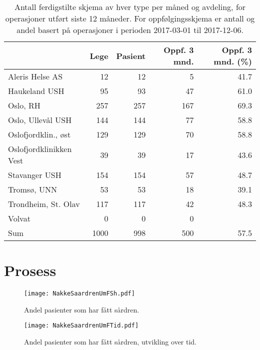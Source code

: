 \documentclass[presentation,xcolor=pdftex,dvipsnames,table]{beamer}\usepackage[]{graphicx}\usepackage[]{color}
\begin{document}
\begin{tiny}
\begin{frame}[fragile]
\begin{table}[ht]
\centering
\begin{tabular}{lrrrr}
  \hline
 & Lege & Pasient & Oppf. 3 mnd. & Oppf. 3 mnd. (\%) \\ 
  \hline
Aleris Helse AS & 12 & 12 & 5 & 41.7 \\ 
  Haukeland USH & 95 & 93 & 47 & 61.0 \\ 
  Oslo, RH & 257 & 257 & 167 & 69.3 \\ 
  Oslo, Ullevål USH & 144 & 144 & 77 & 58.8 \\ 
  Oslofjordklin., øst & 129 & 129 & 70 & 58.8 \\ 
  Oslofjordklinikken Vest & 39 & 39 & 17 & 43.6 \\ 
  Stavanger USH & 154 & 154 & 57 & 48.7 \\ 
  Tromsø, UNN & 53 & 53 & 18 & 39.1 \\ 
  Trondheim, St. Olav & 117 & 117 & 42 & 48.3 \\ 
  Volvat & 0 & 0 & 0 &  \\ 
  Sum & 1000 & 998 & 500 & 57.5 \\ 
   \hline
\end{tabular}
\caption{Antall ferdigstilte skjema av hver type per måned og avdeling, for operasjoner
                                  utført siste 12 måneder. For oppfølgingsskjema er antall og andel basert på operasjoner i perioden 2017-03-01 til 2017-12-06.} 
\end{table}

\end{frame}






\section{Prosess}

\begin{frame}[fragile]
\begin{figure}[ht]
\centering
\texttt{[image: NakkeSaardrenUmFSh.pdf]}
\caption[scale=0.3]{Andel pasienter som har fått sårdren. }
\end{figure}
\end{frame}

\begin{frame}[fragile]
\begin{figure}[ht]
\centering
\texttt{[image: NakkeSaardrenUmFTid.pdf]}
\caption{Andel pasienter som har fått sårdren, utvikling over tid. }
\end{figure}
\end{frame}



\end{tiny}
\end{document}
